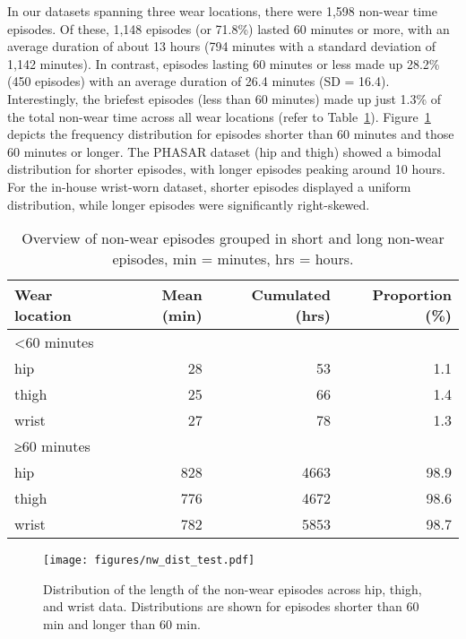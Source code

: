 \documentclass[
  10pt,
]{scrbook}
\begin{document}
In our datasets spanning three wear locations, there were 1,598 non-wear
time episodes. Of these, 1,148 episodes (or 71.8\%) lasted 60 minutes or
more, with an average duration of about 13 hours (794 minutes with a
standard deviation of 1,142 minutes). In contrast, episodes lasting 60
minutes or less made up 28.2\% (450 episodes) with an average duration
of 26.4 minutes (SD = 16.4). Interestingly, the briefest episodes (less
than 60 minutes) made up just 1.3\% of the total non-wear time across
all wear locations (refer to Table~\ref{tbl-9}).
Figure~\ref{fig-paper2_nw_dists} depicts the frequency distribution for
episodes shorter than 60 minutes and those 60 minutes or longer. The
PHASAR dataset (hip and thigh) showed a bimodal distribution for shorter
episodes, with longer episodes peaking around 10 hours. For the in-house
wrist-worn dataset, shorter episodes displayed a uniform distribution,
while longer episodes were significantly right-skewed.

\begingroup

\footnotesize

\hypertarget{tbl-9}{}
\begin{longtable}{lrrr}
\caption{\label{tbl-9}Overview of non-wear episodes grouped in short and long non-wear
episodes, min = minutes, hrs = hours. }\tabularnewline

\toprule
Wear location & Mean (min) & Cumulated (hrs) & Proportion (\%) \\ 
\midrule
\multicolumn{4}{l}{<60 minutes} \\ 
\midrule
hip & 28 & 53 & 1.1 \\ 
thigh & 25 & 66 & 1.4 \\ 
wrist & 27 & 78 & 1.3 \\ 
\midrule
\multicolumn{4}{l}{≥60 minutes} \\ 
\midrule
hip & 828 & 4663 & 98.9 \\ 
thigh & 776 & 4672 & 98.6 \\ 
wrist & 782 & 5853 & 98.7 \\ 
\bottomrule
\end{longtable}

\endgroup

\begin{figure}

{\centering \texttt{[image: figures/nw\_dist\_test.pdf]}

}

\caption{\label{fig-paper2_nw_dists}Distribution of the length of the
non-wear episodes across hip, thigh, and wrist data. Distributions are
shown for episodes shorter than 60 min and longer than 60 min.}

\end{figure}
\end{document}
